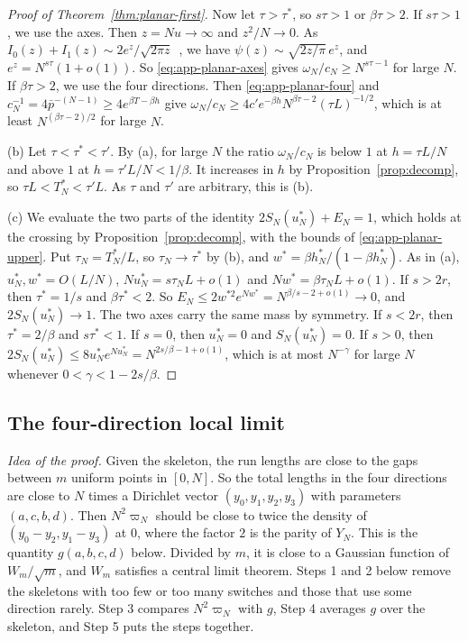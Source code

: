 \begin{proof}[Proof of Theorem~\ref{thm:planar-first}]
Now let $\tau>\tau^*$, so $s\tau>1$ or $\beta\tau>2$. If $s\tau>1$, we use the axes. Then
$z=Nu\to\infty$ and $z^2/N\to0$. As
$I_0(z)+I_1(z)\sim2e^z/\sqrt{2\pi z}$~\cite[Eq.~10.40.1]{dlmf}, we have
$\psi(z)\sim\sqrt{2z/\pi}\,e^z$, and $e^z=N^{s\tau}(1+o(1))$. So \eqref{eq:app-planar-axes} gives
$\omega_N/c_N\ge N^{s\tau-1}$ for large $N$. If $\beta\tau>2$, we use the four directions. Then
\eqref{eq:app-planar-four} and
$c_N^{-1}=4\bar p^{-(N-1)}\ge4e^{\beta T-\beta h}$ give
$\omega_N/c_N\ge4c'e^{-\beta h}N^{\beta\tau-2}(\tau L)^{-1/2}$, which is at least $N^{(\beta\tau-2)/2}$
for large $N$.

(b) Let $\tau<\tau^*<\tau'$. By (a), for large $N$ the ratio $\omega_N/c_N$ is below $1$ at
$h=\tau L/N$ and above $1$ at $h=\tau'L/N<1/\beta$. It increases in $h$ by
Proposition~\ref{prop:decomp}, so $\tau L<T^*_N<\tau'L$. As $\tau$ and $\tau'$ are arbitrary, this
is (b).

(c) We evaluate the two parts of the identity $2S_N(u^*_N)+E_N=1$, which holds at the crossing by
Proposition~\ref{prop:decomp}, with the bounds of \eqref{eq:app-planar-upper}. Put
$\tau_N=T^*_N/L$, so $\tau_N\to\tau^*$ by (b), and $w^*=\beta h^*_N/(1-\beta h^*_N)$. As in
(a), $u^*_N,w^*=O(L/N)$, $Nu^*_N=s\tau_NL+o(1)$ and $Nw^*=\beta\tau_NL+o(1)$. If $s>2r$, then
$\tau^*=1/s$ and $\beta\tau^*<2$. So $E_N\le2w^{*2}e^{Nw^*}=N^{\beta/s-2+o(1)}\to0$, and
$2S_N(u^*_N)\to1$. The two axes carry the same mass by symmetry. If $s<2r$, then
$\tau^*=2/\beta$ and $s\tau^*<1$. If $s=0$, then $u^*_N=0$ and $S_N(u^*_N)=0$. If $s>0$, then
$2S_N(u^*_N)\le8u^*_Ne^{Nu^*_N}=N^{2s/\beta-1+o(1)}$, which is at most $N^{-\gamma}$ for large $N$
whenever $0<\gamma<1-2s/\beta$.
\end{proof}

\subsection{The four-direction local limit}

\emph{Idea of the proof.} Given the skeleton, the run lengths are close to the gaps between $m$
uniform points in $[0,N]$.
So the total lengths in the four directions are close to $N$ times a Dirichlet vector
$(y_0,y_1,y_2,y_3)$ with parameters $(a,c,b,d)$. Then $N^2\varpi_N$ should be close to twice the
density of $(y_0-y_2,y_1-y_3)$ at $0$, where the factor $2$ is the parity of $Y_N$. This is the
quantity $g(a,b,c,d)$ below. Divided by $m$, it is close to a Gaussian function of $W_m/\sqrt m$,
and $W_m$ satisfies a central limit theorem. Steps 1 and 2 below remove the skeletons with too few
or too many switches and those that use some direction rarely. Step 3 compares $N^2\varpi_N$ with
$g$, Step 4 averages $g$ over the skeleton, and Step 5 puts the steps together.


